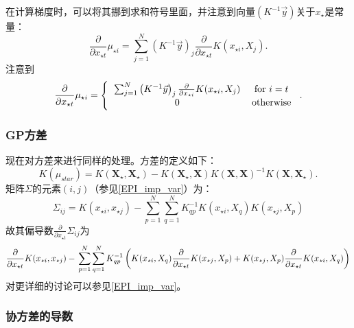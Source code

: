 \documentclass[index]{subfiles}
\begin{document}
在计算梯度时，可以将其挪到求和符号里面，并注意到向量$(K^{-1}\vec{y})$关于$x_{\star}$是常量：
\begin{equation}
 \frac{\partial}{\partial x_{\star t}} \mu_{\star i} = \sum_{j = 1}^{N} \left(K^{-1} \vec{y} \right)_{j} \frac{\partial}{\partial x_{\star t}} K(x_{\star i}, X_{j}).
\end{equation}
注意到
\begin{equation}
\frac{\partial}{\partial x_{\star t}} \mu_{\star i} = \left\{ \begin{tabular}{cc}
                                                                  $\sum_{j = 1}^{N} \left(K^{-1} \vec{y} \right)_{j} \frac{\partial}{\partial x_{\star i}} K(x_{\star i}, X_{j})$ & for $i = t$ \\
								  0 & otherwise
                                                                 \end{tabular}\right..
\end{equation}

\subsubsection{GP方差}
\label{methods_GP_var}

现在对方差来进行同样的处理。方差的定义如下：
\begin{equation}
 K(\mu_{star}) = K(\textbf{X$_{\star}$}, \textbf{X$_{\star}$}) - K(\textbf{X$_{\star}$}, \textbf{X}) K(\textbf{X}, \textbf{X})^{-1} K(\textbf{X}, \textbf{X$_{\star}$}).
\end{equation}
矩阵$\Sigma$的元素$(i,j)$（参见\cref{EPI_imp_var}）为：
\begin{equation}
 \Sigma_{ij} = K(x_{\star i}, x_{\star j}) - \sum_{p = 1}^{N} \sum_{q = 1}^{N} K^{-1}_{qp} K(x_{\star i}, X_{q}) K(x_{\star j}, X_{p})
\end{equation}
故其偏导数$\frac{\partial}{\partial x_{\star t}} \Sigma_{ij}$为
\begin{equation}
 \frac{\partial}{\partial x_{\star t}} K(x_{\star i}, x_{\star j}) - \\
 \sum_{p = 1}^{N} \sum_{q = 1}^{N} K^{-1}_{qp} \left( K(x_{\star i}, X_{q}) \frac{\partial}{\partial x_{\star t}} K(x_{\star j}, X_{p}) + K(x_{\star j}, X_{p}) \frac{\partial}{\partial x_{\star t}} K(x_{\star i}, X_{q}) \right)
\end{equation}
对更详细的讨论可以参见\cref{EPI_imp_var}。

\subsubsection{协方差的导数}
\label{methods_GP_cov}
\end{document}
